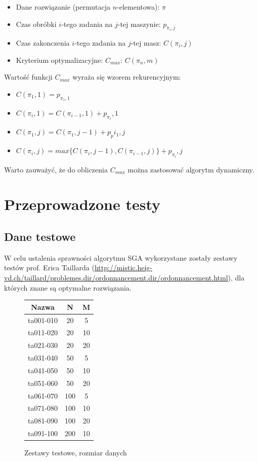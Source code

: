 \documentclass[12pt]{article}
\begin{document}
\begin{itemize}
  \item Dane rozwiązanie (permutacja $n$-elementowa): $\pi$
  \item Czas obróbki $i$-tego zadania na $j$-tej maszynie: $p_{\pi_i,j}$
  \item Czas zakonczenia $i$-tego zadania na $j$-tej masz: $C(\pi_i,j)$
  \item Kryterium optymalizacyjne: $C_{max}$: $C(\pi_n,m)$
\end{itemize}

Wartość funkcji $C_{max}$ wyraża się wzorem rekurencyjnym:

\begin{itemize}
  \item $C(\pi_1,1) = p_{\pi_1,1}$
  \item $C(\pi_i,1) = C(\pi_{i-1},1) + p_{\pi_i},1$
  \item $C(\pi_1,j) = C(\pi_1,j-1) + p_pi_1,j$
  \item $C(\pi_i,j) = max\{C(\pi_i,j-1),C(\pi_{i-1},j)\} + p_{\pi_i},j$
\end{itemize}

Warto zauważyć, że do obliczenia $C_{max}$ można zastosować algorytm dynamiczny. 

\section{Przeprowadzone testy}

\subsection{Dane testowe}

W celu ustalenia sprawności algorytmu SGA wykorzystane zostały zestawy testów prof. Erica Taillarda
(\url{http://mistic.heig-vd.ch/taillard/problemes.dir/ordonnancement.dir/ordonnancement.html}),
dla których znane są optymalne rozwiązania.

\begin{figure}
  \centering
    \begin{tabular}{ | c | c | c | }
      \hline                       
      Nazwa & N & M \\ \hline
      ta001-010 & 20 & 5 \\
      ta011-020 & 20 & 10 \\
      ta021-030 & 20 & 20 \\
      ta031-040 & 50 & 5 \\
      ta041-050 & 50 & 10 \\
      ta051-060 & 50 & 20 \\
      ta061-070 & 100 & 5 \\
      ta071-080 & 100 & 10 \\
      ta081-090 & 100 & 20 \\
      ta091-100 & 200 & 10 \\
      \hline
\end{tabular}
 \caption{Zestawy testowe, rozmiar danych}
  \label{tab:tests}
\end{figure}
\end{document}
